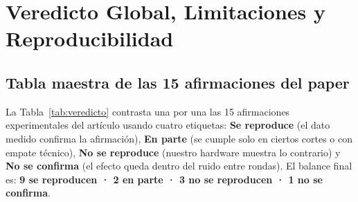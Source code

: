 \documentclass[11pt,a4paper]{article}
\begin{document}
\section{Veredicto Global, Limitaciones y Reproducibilidad}

\subsection{Tabla maestra de las 15 afirmaciones del paper}
La Tabla~\ref{tab:veredicto} contrasta una por una las 15 afirmaciones experimentales del artículo usando cuatro etiquetas: \textbf{Se reproduce} (el dato medido confirma la afirmación), \textbf{En parte} (se cumple solo en ciertos cortes o con empate técnico), \textbf{No se reproduce} (nuestro hardware muestra lo contrario) y \textbf{No se confirma} (el efecto queda dentro del ruido entre rondas). El balance final es: \textbf{9 se reproducen · 2 en parte · 3 no se reproducen · 1 no se confirma}.
\end{document}
